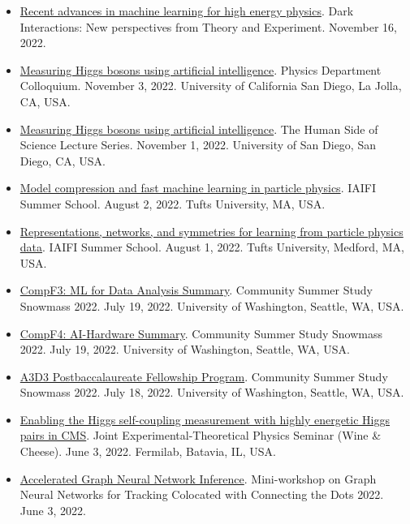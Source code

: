 \documentclass[11pt]{res}
\begin{document}
\begin{resume}
  \begin{itemize}
    \itemsep-0.3em
    \item \href{https://indico.cern.ch/event/1211501/contributions/5128872/}{Recent advances in machine learning for high energy physics}. Dark Interactions: New perspectives from Theory and Experiment. November 16, 2022.
    \item \href{https://indico.cern.ch/event/1219204/}{Measuring Higgs bosons using artificial intelligence}. Physics Department Colloquium. November 3, 2022. University of California San Diego, La Jolla, CA, USA.
    \item \href{https://www.sandiego.edu/events/cas/detail.php?_focus=86860}{Measuring Higgs bosons using artificial intelligence}. The Human Side of Science Lecture Series. November 1, 2022. University of San Diego, San Diego, CA, USA.
    \item \href{https://iaifi.org/summer-school-agenda}{Model compression and fast machine learning in particle physics}. IAIFI Summer School. August 2, 2022. Tufts University, MA, USA.
    \item \href{https://iaifi.org/summer-school-agenda}{Representations, networks, and symmetries for learning from particle physics data}. IAIFI Summer School. August 1, 2022. Tufts University, Medford, MA, USA.
    \item \href{https://indico.fnal.gov/event/22303/contributions/245447}{CompF3: ML for Data Analysis Summary}. Community Summer Study Snowmass 2022. July 19, 2022. University of Washington, Seattle, WA, USA.
    \item \href{https://indico.fnal.gov/event/22303/contributions/245914}{CompF4: AI-Hardware Summary}. Community Summer Study Snowmass 2022. July 19, 2022. University of Washington, Seattle, WA, USA.
    \item \href{https://indico.fnal.gov/event/22303/contributions/244766}{A3D3 Postbaccalaureate Fellowship Program}. Community Summer Study Snowmass 2022. July 18, 2022. University of Washington, Seattle, WA, USA.
    \item \href{https://indico.fnal.gov/event/55499/}{Enabling the Higgs self-coupling measurement with highly energetic Higgs pairs in CMS}. Joint Experimental-Theoretical Physics Seminar (Wine \& Cheese). June 3, 2022. Fermilab, Batavia, IL, USA.
    \item \href{https://indico.cern.ch/event/1128328/contributions/4900731/}{Accelerated Graph Neural Network Inference}. Mini-workshop on Graph Neural Networks for Tracking Colocated with Connecting the Dots 2022. June 3, 2022.

\end{itemize}
\end{resume}
\end{document}
